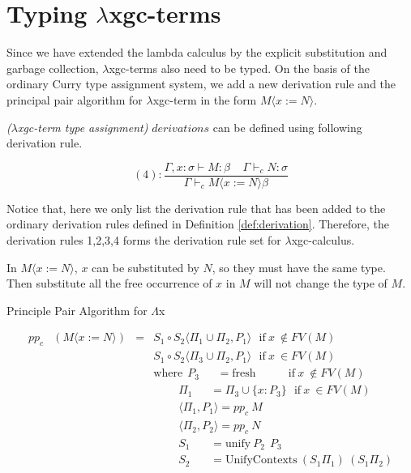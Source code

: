 \section{Typing $\lambda$xgc-terms}

Since we have extended the lambda calculus by the explicit substitution and garbage collection, $\lambda$xgc-terms also need to be typed. On the basis of the ordinary Curry type assignment system, we add a new derivation rule and the principal pair algorithm for $\lambda$xgc-term in the form  $M\langle x:=N\rangle$.

\begin{def1}
\normalfont \textit{($\lambda$xgc-term type assignment)} $derivations$ can be defined using following derivation rule.  
\end{def1}
\begin{equation*}
(4):\frac{\Gamma, {x:\sigma} \vdash M:\beta\ \ \ \ \ \Gamma \vdash _cN:\sigma}{\Gamma \vdash _cM\langle x:=N\rangle \beta} 
\end{equation*}

Notice that, here we only list the derivation rule that has been added to the ordinary derivation rules defined in Definition \ref{def:derivation}. Therefore, the derivation rules 1,2,3,4 forms the derivation rule set for $\lambda$xgc-calculus.

In $M\langle x:=N\rangle$, $x$ can be substituted by $N$, so they must have the same type. Then substitute all the free occurrence of $x$ in $M$ will not change the type of $M$. 


\begin{def1}{\label{def:ppcxgc}}
\normalfont  Principle  Pair  Algorithm  for  $\Lambda$x
\end{def1}


\begin{equation*}
\begin{array}{llll}
pp_c & (M\langle x:=N\rangle) & = & S_1\circ S_2\langle \Pi _1\cup \Pi _2,P_1 \rangle \ \ \ \mathrm{if}\ x\ \not\in FV(M)\\
&&& S_1\circ S_2\langle \Pi _3\cup \Pi _2,P_1 \rangle \ \ \ \mathrm{if}\ x\ \in FV(M)\\
&&& \mathrm{where} \ \ P_3 \ \ \ \ \ \ \ = \mathrm{fresh} \ \ \ \ \ \ \ \ \ \ \ \ \ \mathrm{if}\ x\ \not\in FV(M)\\
&&& \ \ \ \ \ \ \ \ \ \ \Pi _1 \ \ \ \ \ \ \ = \Pi _3 \cup \{x:P_3\}\ \ \ \mathrm{if}\ x\ \in FV(M)\\
&&& \ \ \ \ \ \ \ \ \ \ \langle \Pi _1,P_1\rangle = pp_c\ M\\
&&& \ \ \ \ \ \ \ \ \ \ \langle \Pi _2,P_2\rangle = pp_c\ N\\
&&& \ \ \ \ \ \ \ \ \ \ S_1 \ \ \ \ \ \ \ \ = \mathrm{unify}\ P_2\ \ P_3\\
&&& \ \ \ \ \ \ \ \ \ \ S_2 \ \ \ \ \ \ \ \ = \mathrm{UnifyContexts}\ (S_1\Pi _1)\ (S_1\Pi _2)\\
\end{array}
\end{equation*}



